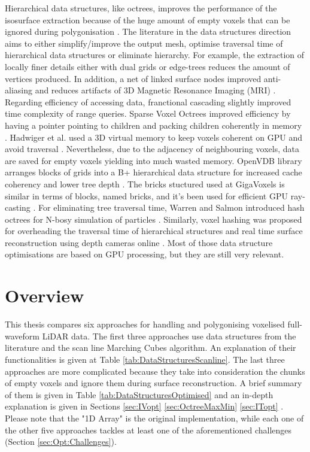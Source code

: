 \documentclass{subfiles}
\begin{document}
\par Hierarchical data structures, like octrees, improves the performance of the isosurface extraction because of the huge amount of empty voxels that can be ignored during polygonisation \cite{Wilhelms1990}. The literature in the data structures direction aims to either simplify/improve the output mesh, optimise traversal time of hierarchical data structures or eliminate hierarchy. For example, the extraction of locally finer details either with dual grids \cite{Scott2005} or edge-trees \cite{Wilhelms1992} reduces the amount of vertices produced. In addition, a net of linked surface nodes improved anti-aliasing and reduces artifacts of 3D Magnetic Resonance Imaging {\color{red}(MRI)} \cite{Gibson1998}. Regarding efficiency of accessing data,  franctional cascading slightly improved time complexity of range queries\cite{Chazelle1986}. Sparse Voxel Octrees improved efficiency by having a pointer pointing to children and packing children coherently in memory \cite{Laine2011SparseOctrees}. Hadwiger et al. used a 3D virtual memory to keep voxels coherent on GPU and avoid traversal \cite{Hadwiger2012}. Nevertheless, due to the adjacency of neighbouring voxels, data are saved for empty voxels yielding into much wasted memory. OpenVDB library arranges blocks of grids into a B+ hierarchical data structure for increased cache coherency and lower tree depth \cite{Museth2013OpenVDB}. The bricks stuctured used at GigaVoxels is similar in terms of blocks, named bricks, and it's been used for efficient GPU ray-casting \cite{Crassin2009}. For eliminating tree traversal time, Warren and Salmon introduced hash octrees for N-bosy simulation of particles \cite{Warren1993hashedOctree}. Similarly, voxel hashing was proposed for overheading the traversal time of hierarchical structures and real time surface reconstruction using depth cameras online \cite{Nievner2016voxelHashing}. Most of those data structure optimisations are based on GPU processing, but they are still very relevant.


\section{Overview}



\par This thesis compares six approaches for handling and polygonising voxelised full-waveform LiDAR data. The first three approaches use data structures from the literature and the scan line Marching Cubes algorithm. An explanation of their functionalities is given at Table \ref{tab:DataStructuresScanline}. The last three approaches are more complicated because they take into consideration the chunks of empty voxels and ignore them during surface reconstruction. A brief summary of them is given in Table \ref{tab:DataStructuresOptimised} and an in-depth explanation is given in Sections \ref{sec:IVopt} \ref{sec:OctreeMaxMin} \ref{sec:ITopt} . Please note that the "1D Array" is the original implementation, while each one of the other five approaches tackles at least one of the aforementioned challenges (Section \ref{sec:Opt:Challenges}). 
\end{document}
